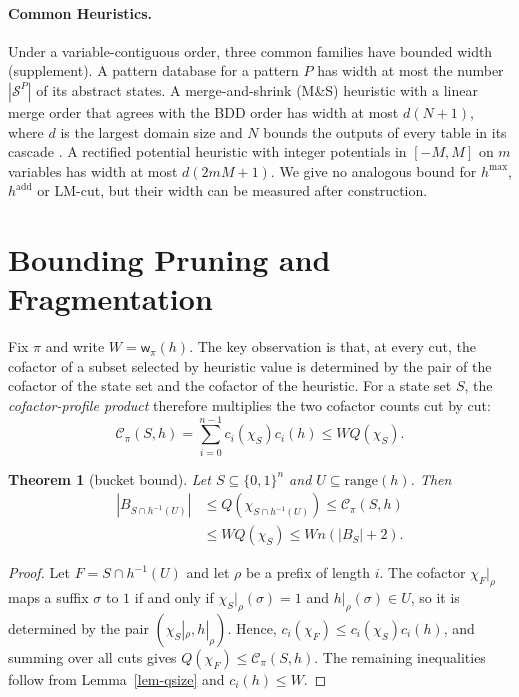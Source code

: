 \documentclass[letterpaper]{article}
\newcommand{\states}{\ensuremath{\mathcal{S}}}
\newcommand{\bddsize}[1]{\ensuremath{|B_{#1}|}}
\newcommand{\cofcount}{\ensuremath{Q}}
\newcommand{\width}{\ensuremath{\mathsf{w}}}
\newcommand{\cutcount}[2]{\ensuremath{c_{#1}(#2)}}
\newcommand{\cutprod}[2]{\ensuremath{\mathcal{C}_{\pi}(#1,#2)}}
\newcommand{\hrange}{\ensuremath{\mathrm{range}}}
\theoremstyle{plain}
\newtheorem{theorem}{Theorem}
\theoremstyle{definition}
\theoremstyle{remark}
\begin{document}
\paragraph{Common Heuristics.}
Under a variable-contiguous order, three common families have bounded width (supplement).
A pattern database \citep[PDB;][]{culberson-schaeffer-compint1998,edelkamp-ecp2001} for a pattern $P$ has width at most the number $|\states^P|$ of its abstract states.
A merge-and-shrink (M\&S) heuristic \citep{helmert-et-al-jacm2014} with a linear merge order that agrees with the BDD order has width at most $d(N+1)$, where $d$ is the largest domain size and $N$ bounds the outputs of every table in its cascade \citep{helmert-et-al-icaps2015}.
A rectified potential heuristic \citep{pommerening-et-al-aaai2015} with integer potentials in $[-M,M]$ on $m$ variables has width at most $d(2mM+1)$.
We give no analogous bound for $h^{\max}$, $h^{\mathrm{add}}$ or LM-cut, but their width can be measured after construction.

\section{Bounding Pruning and Fragmentation}
\label{sec-fragmentation}

Fix $\pi$ and write $W=\width_\pi(h)$.
The key observation is that, at every cut, the cofactor of a subset selected by heuristic value is determined by the pair of the cofactor of the state set and the cofactor of the heuristic.
For a state set $S$, the \emph{cofactor-profile product} therefore multiplies the two cofactor counts cut by cut:
\[
  \cutprod{S}{h}=\textstyle\sum_{i=0}^{n-1} \cutcount{i}{\chi_S}\cutcount{i}{h}\leq W\cofcount(\chi_S).
\]

\begin{theorem}[bucket bound]
\label{thm-bucket}
Let $S \subseteq \{0,1\}^n$ and $U \subseteq \hrange(h)$.
Then
\[
\begin{aligned}
\bddsize{S \cap h^{-1}(U)}
  &\leq \cofcount(\chi_{S \cap h^{-1}(U)}) \leq \cutprod{S}{h} \\
  &\leq W\cofcount(\chi_S) \leq Wn(\bddsize{S}+2).
\end{aligned}
\]
\end{theorem}

\begin{proof}
Let $F=S\cap h^{-1}(U)$ and let $\rho$ be a prefix of length $i$.
The cofactor $\chi_F|_\rho$ maps a suffix $\sigma$ to $1$ if and only if $\chi_S|_\rho(\sigma)=1$ and $h|_\rho(\sigma)\in U$, so it is determined by the pair $(\chi_S|_\rho,h|_\rho)$.
Hence, $\cutcount{i}{\chi_F}\leq\cutcount{i}{\chi_S}\cutcount{i}{h}$, and summing over all cuts gives $\cofcount(\chi_F)\leq\cutprod{S}{h}$.
The remaining inequalities follow from Lemma~\ref{lem-qsize} and $\cutcount{i}{h}\leq W$.
\end{proof}
\end{document}
